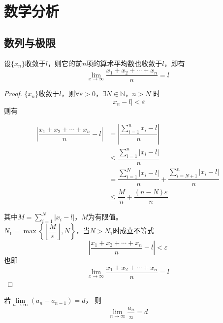 \chapter{数学分析}

\section{数列与极限}

\begin{proposition}[Cauthy命题]

    设$\{x_n\}$收敛于$l$，则它的前$n$项的算术平均数也收敛于$l$，即有
    \[\lim\limits_{x \to \infty}{\dfrac{x_1 + x_2 + \cdots + x_n}{n}} = l\]

\end{proposition}

\begin{proof}

    $\{x_n\}$收敛于$l$，则$\forall \varepsilon > 0$，$\exists N \in \mathbb{N}$，$n > N$ 时
    \[|x_n - l| < \varepsilon\]
    则有

    \begin{align*}
        \left| \dfrac{x_1 + x_2 + \cdots + x_n}{n} - l \right| & = \left| \dfrac{\sum\limits_{i = 1}^{n}{x_i - l}}{n} \right| \\
        & \leq \dfrac{\sum\limits_{i = 1}^{n}{|x_i - l|}}{n} \\
        & = \dfrac{\sum\limits_{i = 1}^{N}{|x_i - l|}}{n} + \dfrac{\sum\limits_{i = N + 1}^{n}{|x_i - l|}}{n} \\
        & \leq \dfrac{M}{n} + \dfrac{(n - N)\varepsilon}{n}
    \end{align*}

    其中$M = \sum\limits_{i = 1}^{N}{|x_i - l|}$，$M$为有限值。\\
    $N_1 = \max\left\{ \left\lfloor \dfrac{M}{\varepsilon} \right\rfloor, N \right\}$，当$N > N_1$时成立不等式
    \[\left| \dfrac{x_1 + x_2 + \cdots + x_n}{n} - l \right| < \varepsilon\]
    也即
    \[\lim\limits_{x \to \infty}{\dfrac{x_1 + x_2 + \cdots + x_n}{n}} = l\]

\end{proof}

\begin{corollary}[Cauthy命题推论]

    若$\lim\limits_{n \to \infty}{(a_n - a_{n - 1})} = d$，
    则
    \[\lim\limits_{n \to \infty}{\dfrac{a_n}{n}} = d\]

\end{corollary}

